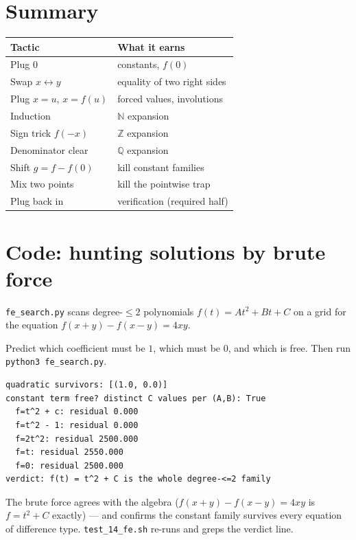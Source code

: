 \section{Summary}
\begin{center}\small
\begin{tabular}{@{}ll@{}}
\toprule
\textbf{Tactic} & \textbf{What it earns} \\
\midrule
Plug $0$ & constants, $f(0)$ \\
Swap $x\leftrightarrow y$ & equality of two right sides \\
Plug $x=u$, $x=f(u)$ & forced values, involutions \\
Induction & $\mathbb N$ expansion \\
Sign trick $f(-x)$ & $\mathbb Z$ expansion \\
Denominator clear & $\mathbb Q$ expansion \\
Shift $g=f-f(0)$ & kill constant families \\
Mix two points & kill the pointwise trap \\
Plug back in & verification (required half) \\
\bottomrule
\end{tabular}
\end{center}

\section{Code: hunting solutions by brute force}
\texttt{fe\_search.py} scans degree-$\le2$ polynomials
$f(t)=At^2+Bt+C$ on a grid for the equation
$f(x+y)-f(x-y)=4xy$.
\begin{checkpoint}
Predict which coefficient must be $1$, which must be $0$, and which is
free. Then run \texttt{python3 fe\_search.py}.
\end{checkpoint}
\begin{lstlisting}
quadratic survivors: [(1.0, 0.0)]
constant term free? distinct C values per (A,B): True
  f=t^2 + c: residual 0.000
  f=t^2 - 1: residual 0.000
  f=2t^2: residual 2500.000
  f=t: residual 2550.000
  f=0: residual 2500.000
verdict: f(t) = t^2 + C is the whole degree-<=2 family
\end{lstlisting}
The brute force agrees with the algebra ($f(x+y)-f(x-y)=4xy$ is
$f=t^2+C$ exactly) --- and confirms the constant family survives every
equation of difference type. \texttt{test\_14\_fe.sh} re-runs and greps
the verdict line.

